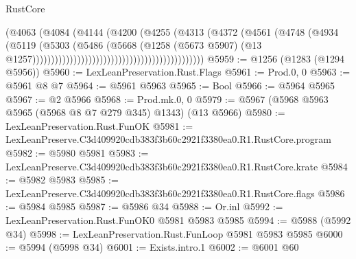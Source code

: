 \begin{lexlean}{RustCore}
\begin{coremodule}
                                                                (@4063
                                                                  (@4084
                                                                    (@4144
                                                                      (@4200
                                                                        (@4255
                                                                          (@4313
                                                                            (@4372
                                                                              (@4561
                                                                                (@4748
                                                                                  (@4934
                                                                                    (@5119
                                                                                      (@5303
                                                                                        (@5486
                                                                                          (@5668
                                                                                            (@1258
                                                                                              (@5673
                                                                                                @5907)
                                                                                              (@13
                                                                                                @1257))))))))))))))))))))))))))))))))))))))))))))))
@5959 := @1256 (@1283 (@1294 @5956))
@5960 := LexLeanPreservation.Rust.Flags
@5961 := Prod.{0, 0}
@5963 := @5961 @8 @7
@5964 := @5961 @5963
@5965 := Bool
@5966 := @5964 @5965
@5967 := @2 @5966
@5968 := Prod.mk.{0, 0}
@5979 := @5967 (@5968 @5963 @5965 (@5968 @8 @7 @279 @345) @1343) (@13 @5966)
@5980 := LexLeanPreservation.Rust.FunOK
@5981 := LexLeanPreserve.C3d409920cdb383f3b60c2921f3380ea0.R1.RustCore.program
@5982 := @5980 @5981
@5983 := LexLeanPreserve.C3d409920cdb383f3b60c2921f3380ea0.R1.RustCore.krate
@5984 := @5982 @5983
@5985 := LexLeanPreserve.C3d409920cdb383f3b60c2921f3380ea0.R1.RustCore.flags
@5986 := @5984 @5985
@5987 := @5986 @34
@5988 := Or.inl
@5992 := LexLeanPreservation.Rust.FunOK0 @5981 @5983 @5985
@5994 := @5988 (@5992 @34)
@5998 := LexLeanPreservation.Rust.FunLoop @5981 @5983 @5985
@6000 := @5994 (@5998 @34)
@6001 := Exists.intro.{1}
@6002 := @6001 @60

\end{coremodule}
\end{lexlean}
